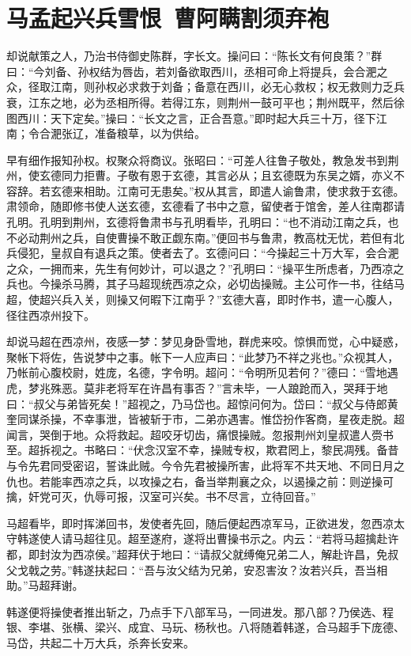 \chapter{马孟起兴兵雪恨~曹阿瞒割须弃袍}

却说献策之人，乃治书侍御史陈群，字长文。操问曰：“陈长文有何良策？”群曰：“今刘备、孙权结为唇齿，若刘备欲取西川，丞相可命上将提兵，会合淝之众，径取江南，则孙权必求救于刘备；备意在西川，必无心救权；权无救则力乏兵衰，江东之地，必为丞相所得。若得江东，则荆州一鼓可平也；荆州既平，然后徐图西川：天下定矣。”操曰：“长文之言，正合吾意。”即时起大兵三十万，径下江南；令合淝张辽，准备粮草，以为供给。

早有细作报知孙权。权聚众将商议。张昭曰：“可差人往鲁子敬处，教急发书到荆州，使玄德同力拒曹。子敬有恩于玄德，其言必从；且玄德既为东吴之婿，亦义不容辞。若玄德来相助。江南可无患矣。”权从其言，即遣人谕鲁肃，使求救于玄德。肃领命，随即修书使人送玄德，玄德看了书中之意，留使者于馆舍，差人往南郡请孔明。孔明到荆州，玄德将鲁肃书与孔明看毕，孔明曰：“也不消动江南之兵，也不必动荆州之兵，自使曹操不敢正觑东南。”便回书与鲁肃，教高枕无忧，若但有北兵侵犯，皇叔自有退兵之策。使者去了。玄德问曰：“今操起三十万大军，会合淝之众，一拥而来，先生有何妙计，可以退之？”孔明曰：“操平生所虑者，乃西凉之兵也。今操杀马腾，其子马超现统西凉之众，必切齿操贼。主公可作一书，往结马超，使超兴兵入关，则操又何暇下江南乎？”玄德大喜，即时作书，遣一心腹人，径往西凉州投下。

却说马超在西凉州，夜感一梦：梦见身卧雪地，群虎来咬。惊惧而觉，心中疑惑，聚帐下将佐，告说梦中之事。帐下一人应声曰：“此梦乃不祥之兆也。”众视其人，乃帐前心腹校尉，姓庞，名德，字令明。超问：“令明所见若何？”德曰：“雪地遇虎，梦兆殊恶。莫非老将军在许昌有事否？”言未毕，一人踉跄而入，哭拜于地曰：“叔父与弟皆死矣！”超视之，乃马岱也。超惊问何为。岱曰：“叔父与侍郎黄奎同谋杀操，不幸事泄，皆被斩于市，二弟亦遇害。惟岱扮作客商，星夜走脱。超闻言，哭倒于地。众将救起。超咬牙切齿，痛恨操贼。忽报荆州刘皇叔遣人赍书至。超拆视之。书略曰：“伏念汉室不幸，操贼专权，欺君罔上，黎民凋残。备昔与令先君同受密诏，誓诛此贼。今令先君被操所害，此将军不共天地、不同日月之仇也。若能率西凉之兵，以攻操之右，备当举荆襄之众，以遏操之前：则逆操可擒，奸党可灭，仇辱可报，汉室可兴矣。书不尽言，立待回音。”

马超看毕，即时挥涕回书，发使者先回，随后便起西凉军马，正欲进发，忽西凉太守韩遂使人请马超往见。超至遂府，遂将出曹操书示之。内云：“若将马超擒赴许都，即封汝为西凉侯。”超拜伏于地曰：“请叔父就缚俺兄弟二人，解赴许昌，免叔父戈戟之劳。”韩遂扶起曰：“吾与汝父结为兄弟，安忍害汝？汝若兴兵，吾当相助。”马超拜谢。

韩遂便将操使者推出斩之，乃点手下八部军马，一同进发。那八部？乃侯选、程银、李堪、张横、梁兴、成宜、马玩、杨秋也。八将随着韩遂，合马超手下庞德、马岱，共起二十万大兵，杀奔长安来。

